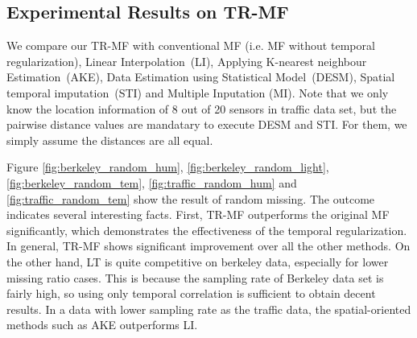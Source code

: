 \subsection{Experimental Results on TR-MF} \label{subsec:exp_basic}%
We compare our TR-MF with conventional MF (i.e. MF without temporal regularization), Linear Interpolation~(LI), Applying K-nearest neighbour Estimation~(AKE), Data Estimation using Statistical Model~(DESM), Spatial temporal imputation~(STI) and Multiple Inputation (MI).
Note that we only know the location information of 8 out of 20 sensors in traffic data set, but the pairwise distance values are mandatary to execute DESM and STI. For them, we simply assume the distances are all equal.


Figure \ref{fig:berkeley_random_hum}, \ref{fig:berkeley_random_light}, \ref{fig:berkeley_random_tem}, \ref{fig:traffic_random_hum} and \ref{fig:traffic_random_tem} show the result of random missing. The outcome indicates several interesting facts. First, TR-MF outperforms the original MF significantly, which demonstrates the effectiveness of the temporal regularization. In general, TR-MF shows significant improvement over all the other methods. On the other hand, LT is quite competitive on berkeley data, especially for lower missing ratio cases. This is because the sampling rate of Berkeley data set is fairly high, so using only temporal correlation is sufficient to obtain decent results. In a data with lower sampling rate as the traffic data, the spatial-oriented methods such as AKE outperforms LI. 

